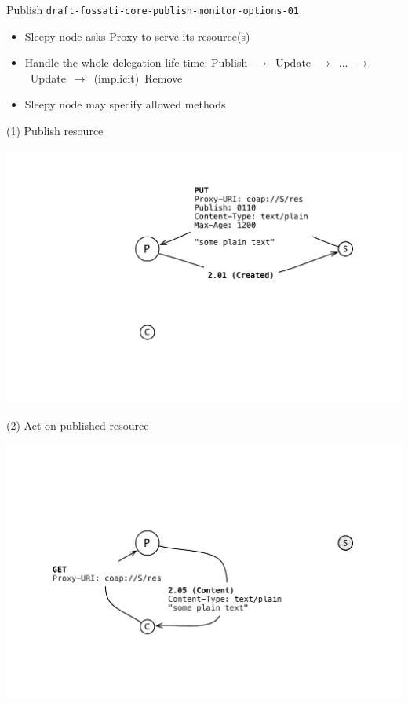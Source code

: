 \documentclass{beamer}
\begin{document}
\begin{frame}{Publish \hspace{5cm} {\tiny \texttt{draft-fossati-core-publish-monitor-options-01}}}

\begin{itemize}
 \item Sleepy node asks Proxy to serve its resource(s)
 \item Handle the whole delegation life-time: \mbox{\small{Publish $\rightarrow$ Update $\rightarrow$ ... $\rightarrow$ Update $\rightarrow$ (implicit) Remove}}
 \item Sleepy node may specify allowed methods %
\end{itemize}

\end{frame}

\begin{frame}{(1) Publish resource}
 \begin{center}
  \includegraphics[width=\textwidth]{../../share/images/publish0.pdf}
 \end{center}
\end{frame}

\begin{frame}{(2) Act on published resource}
 \begin{center}
  \includegraphics[width=\textwidth]{../../share/images/publish1.pdf}
 \end{center}
\end{frame}
\end{document}
